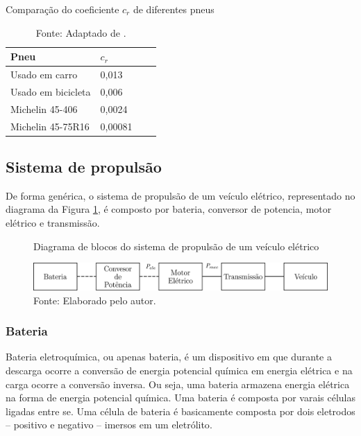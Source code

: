 
\begin{table}[H]
	\centering
	\caption{Comparação do coeficiente $c_{r}$ de diferentes pneus}
	\begin{tabular}{llll}
		\toprule
		Pneu               & $c_{r}$ &  & \\
		\hline
		Usado em carro     & 0,013   &  & \\
		Usado em bicicleta & 0,006   &  & \\
		Michelin 45-406    & 0,0024  &  & \\
		Michelin 45-75R16  & 0,00081 &  & \\
		\bottomrule
	\end{tabular}
	\caption*{\footnotesize Fonte: Adaptado de \citeauthor{book:PacCarII}.}
	\label{tab:ComparacaoCr}
\end{table}

\subsection{Sistema de propulsão}
\label{subsec:sistema_propulsao}

De forma genérica, o sistema de propulsão de um veículo elétrico, representado no diagrama da Figura \ref{fig:diagrama_propulsao}, é composto por
bateria, conversor de potencia, motor elétrico e transmissão.

\begin{figure}[H]
	\centering
	\caption{Diagrama de blocos do sistema de propulsão de um veículo elétrico}
	\label{fig:diagrama_propulsao}
	\includegraphics{DescricaoProcesso/Figuras/g874.png}
	\caption*{\footnotesize Fonte: Elaborado pelo autor.}
\end{figure}

\subsubsection{Bateria}

Bateria eletroquímica, ou apenas bateria, é um dispositivo em que durante a descarga ocorre a conversão de energia potencial química em energia
elétrica e na carga ocorre a conversão inversa. Ou seja, uma bateria armazena energia elétrica na forma de energia potencial química. Uma bateria é
composta por varais células ligadas entre se. Uma célula de bateria é basicamente composta por dois eletrodos -- positivo e
negativo -- imersos em um eletrólito\cite{book:Modern_Electric_Vehicles}.

